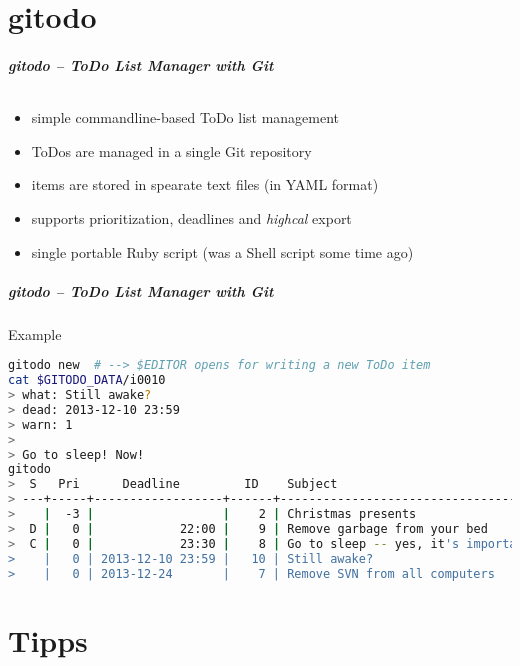 \documentclass[english,hyperref={pdfpagelabels=false},aspectratio=169]{beamer}
\begin{document}
\part{gitodo}
\makepart

\begin{frame}[label=gitodo]
  \frametitle{gitodo -- ToDo List Manager with Git}
  \framesubtitle{}
  \begin{itemize}
    \item simple commandline-based ToDo list management
    \item ToDos are managed in a single Git repository
    \item items are stored in spearate text files {\scriptsize\color{fzjgray50}(in YAML format)}
    \item supports prioritization, deadlines and \textit{highcal} export
    \item single portable Ruby script {\scriptsize\color{fzjgray50}(was a Shell script some time ago)}
  \end{itemize}
\end{frame}

\begin{frame}[fragile]
  \frametitle{gitodo -- ToDo List Manager with Git}
  \begin{block}{Example}
    \vspace{-0.75em}
    \begin{lstlisting}[language=zsh]
gitodo new  # --> $EDITOR opens for writing a new ToDo item
cat $GITODO_DATA/i0010
> what: Still awake?
> dead: 2013-12-10 23:59
> warn: 1
>
> Go to sleep! Now!
gitodo
>  S   Pri      Deadline         ID    Subject
> ---+-----+------------------+------+-----------------------------------
>    |  -3 |                  |    2 | Christmas presents
>  D |   0 |            22:00 |    9 | Remove garbage from your bed
>  C |   0 |            23:30 |    8 | Go to sleep -- yes, it's important
>    |   0 | 2013-12-10 23:59 |   10 | Still awake?
>    |   0 | 2013-12-24       |    7 | Remove SVN from all computers
    \end{lstlisting}
    \vspace{-0.75em}
  \end{block}
\end{frame}


\part{Tipps}
\makepart
\end{document}
